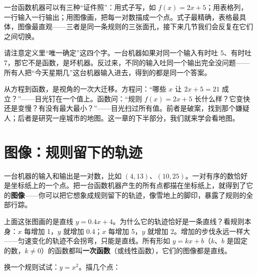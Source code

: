 一台函数机器可以有三种“证件照”：用式子写，如 $f(x) = 2x + 5$；用表格列，一行输入一行输出；用图像画，把每一对数描成一个点。式子最精确，表格最具体，图像最直观——三者是同一条规则的三张面孔，接下来几节我们会反复在它们之间切换。

请注意定义里“唯一确定”这四个字。一台机器如果对同一个输入有时吐 5、有时吐 7，那它不是函数，是坏机器。反过来，不同的输入吐同一个输出完全没问题——所有人把“今天星期几”这台机器输入进去，得到的都是同一个答案。

从方程到函数，是视角的一次大迁移。方程问：“哪些 $x$ 让 $2x + 5 = 21$ 成立？”——目光钉在一个值上。函数问：“规则 $f(x) = 2x + 5$ 长什么样？它变快还是变慢？有没有最大最小？”——目光扫过所有值。前者是破案，找到那个嫌疑人；后者是研究一座城市的地图。这一章的下半部分，我们就来学会看地图。

\section{图像：规则留下的轨迹}

一台机器的输入和输出是一对数，比如 $(4, 13)$、$(10, 25)$。一对有序的数恰好是坐标纸上的一个点。把一台函数机器产生的所有点都描在坐标纸上，就得到了它的\textbf{图像}——你可以把它想象成规则留下的轨迹，像雪地上的脚印，暴露了规则的全部行踪。

\begin{center}
\end{center}

上面这张图画的是直线 $y = 0.4x + 4$。为什么它的轨迹恰好是一条直线？看规则本身：$x$ 每增加 1，$y$ 就增加 0.4；$x$ 每增加 5，$y$ 就增加 2。增加的步伐永远一样大——匀速变化的轨迹不会拐弯，只能是直线。所有形如 $y = kx + b$（$k$、$b$ 是固定的数，$k \neq 0$）的函数都叫\textbf{一次函数}（或线性函数），它们的图像都是直线。

换一个规则试试：$y = x^2$。描几个点：

